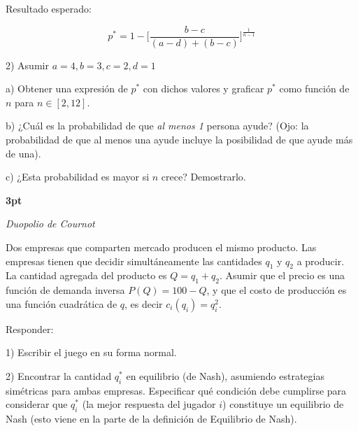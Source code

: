 \documentclass[12pt]{scrartcl}
\begin{document}
\begin{Exercise}[name={Ejercicio}]

Resultado esperado:

\[ p^* =1 - \Bigg [ \frac{b-c}{(a-d) + (b-c)} \Bigg]^{\frac{1}{n-1}} \]

2) Asumir $a=4, b=3, c=2, d=1$

a) Obtener una expresión de $p^*$ con dichos valores y graficar $p^*$ como función de $n$ para $n \in [2, 12]$.

b) ¿Cuál es la probabilidad de que \textit{al menos 1} persona ayude? (Ojo: la probabilidad de que al menos una ayude incluye la posibilidad de que ayude más de una).

c) ¿Esta probabilidad es mayor si $n$ crece? Demostrarlo.

\end{Exercise}

\begin{Exercise}[name={Ejercicio}]
\textbf{3pt}

\textit{Duopolio de Cournot}

Dos empresas que comparten mercado producen el mismo producto. Las empresas tienen que decidir simultáneamente las cantidades $q_1$ y $q_2$  a producir. La cantidad agregada del producto es $Q=q_1+q_2$. Asumir que el precio es una función de demanda inversa $P(Q)=100-Q$, y que el costo de producción es una función cuadrática de $q$, es decir $c_i(q_i)=q^2_i$.

Responder:

1) Escribir el juego en su forma normal. 

2) Encontrar la cantidad $q_i^*$  en equilibrio (de Nash), asumiendo estrategias simétricas para ambas empresas. Especificar qué condición debe cumplirse para considerar que $q_i^*$ (la mejor respuesta del jugador $i$) constituye un equilibrio de Nash (esto viene en la parte de la definición de Equilibrio de Nash).
\end{Exercise}
\end{document}
